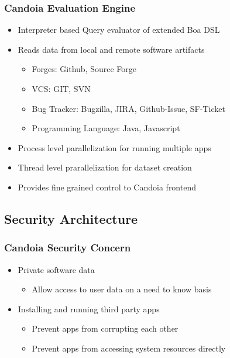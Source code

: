         \begin{frame}
            \frametitle{Candoia Evaluation Engine}
            \begin{itemize}
                \item Interpreter based Query evaluator of extended Boa DSL
                \item Reads data from local and remote software artifacts
                    \begin{itemize}
                        \item Forges: Github, Source Forge
                        \item VCS: GIT, SVN
                        \item Bug Tracker: Bugzilla, JIRA, Github-Issue, SF-Ticket
                        \item Programming Language: Java, Javascript
                    \end{itemize}
                \item Process level parallelization for running multiple apps
                \item Thread level prarallelization for dataset creation
                \item Provides fine grained control to Candoia frontend
                \end{itemize}
            \end{frame}



    \subsection{Security Architecture}
        \begin{frame}
            \frametitle{Candoia Security Concern}
            \begin{itemize}
                \item Private software data
                    \begin{itemize}
                        \item Allow access to user data on a need to know basis
                    \end{itemize}
                \item Installing and running third party apps
                    \begin{itemize}
                        \item Prevent apps from corrupting each other
                        \item Prevent apps from accessing system resources directly
                    \end{itemize}
            \end{itemize}
         \end{frame}

